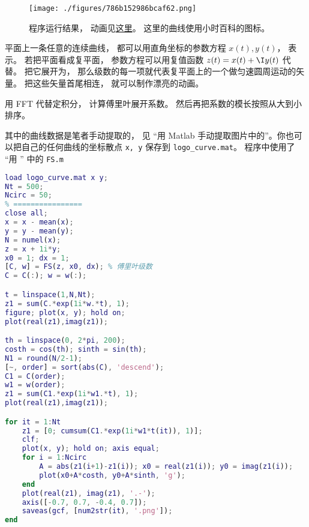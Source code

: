 
\begin{issues}
\issueDraft
\end{issues}


\begin{figure}[ht]
\centering
\texttt{[image: ./figures/786b152986bcaf62.png]}
\caption{程序运行结果， 动画见\href{https://wuli.wiki/apps/FFTplt.html}{这里}。 这里的曲线使用小时百科的图标。} \label{fig_FFTdrw_1}
\end{figure}

平面上一条任意的连续曲线， 都可以用直角坐标的参数方程 $x(t), y(t)$， 表示。 若把平面看成复平面， 参数方程可以用复值函数 $z(t) = x(t) + \I y(t)$ 代替。 把它展开为， 那么级数的每一项就代表复平面上的一个做匀速圆周运动的矢量。 把这些矢量首尾相连， 就可以制作漂亮的动画。

用 FFT 代替定积分， 计算傅里叶展开系数。 然后再把系数的模长按照从大到小排序。

其中的曲线数据是笔者手动提取的， 见 “用 Matlab 手动提取图片中的”。你也可以把自己的任何曲线的坐标散点 \verb|x, y| 保存到 \verb|logo_curve.mat|。 程序中使用了 “用 ” 中的 \verb|FS.m|

\begin{lstlisting}[language=matlab, caption=FFTplt.m]
% ==== 参数设置 ====
load logo_curve.mat x y;
Nt = 500;
Ncirc = 50;
% ================
close all;
x = x - mean(x);
y = y - mean(y);
N = numel(x);
z = x + 1i*y;
x0 = 1; dx = 1;
[C, w] = FS(z, x0, dx); % 傅里叶级数
C = C(:); w = w(:);

t = linspace(1,N,Nt);
z1 = sum(C.*exp(1i*w.*t), 1);
figure; plot(x, y); hold on;
plot(real(z1),imag(z1));

th = linspace(0, 2*pi, 200);
costh = cos(th); sinth = sin(th);
N1 = round(N/2-1);
[~, order] = sort(abs(C), 'descend');
C1 = C(order);
w1 = w(order);
z1 = sum(C1.*exp(1i*w1.*t), 1);
plot(real(z1),imag(z1));

for it = 1:Nt
    z1 = [0; cumsum(C1.*exp(1i*w1*t(it)), 1)];
    clf;
    plot(x, y); hold on; axis equal;
    for i = 1:Ncirc
        A = abs(z1(i+1)-z1(i)); x0 = real(z1(i)); y0 = imag(z1(i));
        plot(x0+A*costh, y0+A*sinth, 'g');
    end
    plot(real(z1), imag(z1), '.-');
    axis([-0.7, 0.7, -0.4, 0.7]);
    saveas(gcf, [num2str(it), '.png']);
end
\end{lstlisting}
